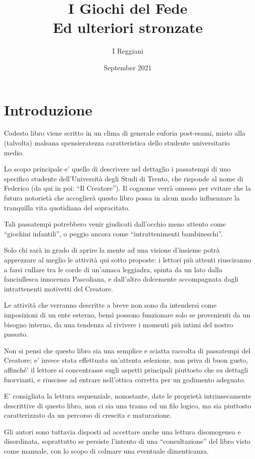 \documentclass{article}
\title{%
  I Giochi del Fede\\
  \large Ed ulteriori stronzate}
\author{I Reggiani}
\date{September 2021}
\begin{document}
\maketitle
\newpage
\tableofcontents
\newpage
\section{Introduzione}
Codesto libro viene scritto in un clima di generale euforia post-esami, misto alla (talvolta) malsana spensieratezza caratteristica dello studente universitario medio.

Lo scopo principale e' quello di descrivere nel dettaglio i passatempi di uno specifico studente dell'Università degli Studi di Trento, che risponde al nome di Federico (da qui in poi: “Il Creatore”). Il cognome verrà omesso per evitare che la futura notorietà che accoglierà questo libro possa in alcun modo influenzare la tranquilla vita quotidiana del sopracitato.

Tali passatempi potrebbero venir giudicati dall'occhio meno attento come “giochini infantili”, o peggio ancora come “intrattenimenti bambineschi”.

Solo chi sarà in grado di aprire la mente ad una visione d'insieme potrà apprezzare al meglio le attività qui sotto proposte: i lettori più attenti riusciranno a farsi cullare tra le corde di un'amaca leggiadra, spinta da un lato dalla fanciullesca innocenza Pascoliana, e dall'altro  dolcemente accompagnata dagli intrattenenti motivetti del Creatore.

Le attività che verranno descritte a breve non sono da intendersi come imposizioni di un ente esterno, bensì possono funzionare solo se provenienti da un bisogno interno, da una tendenza al rivivere i momenti più intimi del nostro passato.

Non si pensi che questo libro sia una semplice e sciatta raccolta di passatempi del Creatore; e' invece stata effettuata un'attenta selezione, non priva di buon gusto, affinché' il lettore si concentrasse sugli aspetti principali piuttosto che su dettagli fuorvianti, e riuscisse ad entrare nell'ottica corretta per un godimento adeguato.

E' consigliata la lettura sequenziale, nonostante, date le proprietà intrinsecamente descrittive di questo libro, non ci sia una trama od un filo logico, ma sia piuttosto caratterizzato da un percorso di crescita e maturazione.

Gli autori sono tuttavia disposti ad accettare anche una lettura disomogenea e disordinata, soprattutto se persiste l'intento di una “consultazione” del libro visto come manuale, con lo scopo di colmare una eventuale dimenticanza.
\end{document}
